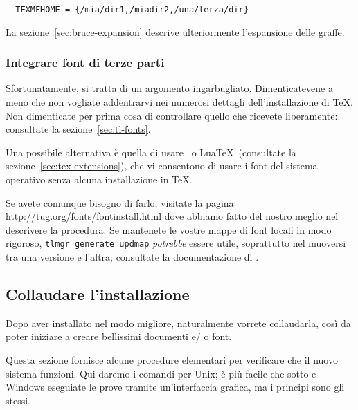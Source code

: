 \documentclass{article}
\begin{document}
\begin{verbatim}
  TEXMFHOME = {/mia/dir1,/miadir2,/una/terza/dir}
\end{verbatim}

La sezione~\ref{sec:brace-expansion} descrive ulteriormente l'espansione
delle graffe.


\subsubsection{Integrare font di terze parti}

Sfortunatamente, si tratta di un argomento ingarbugliato. Dimenticatevene
a meno che non vogliate addentrarvi nei numerosi dettagli
dell'installazione di \TeX{}. Non dimenticate per prima cosa di
controllare quello che ricevete liberamente: consultate la
sezione~\ref{sec:tl-fonts}.

Una possibile alternativa è quella di usare \XeTeX\ o Lua\TeX\ (consultate
la sezione~\ref{sec:tex-extensions}), che vi consentono di usare i font
del sistema operativo senza alcuna installazione in \TeX.

Se avete comunque bisogno di farlo, visitate la pagina
\url{http://tug.org/fonts/fontinstall.html} dove abbiamo fatto del nostro
meglio nel descrivere la procedura. Se mantenete le vostre mappe di font
locali in modo rigoroso, \texttt{tlmgr generate updmap} \textit{potrebbe}
essere utile, soprattutto nel muoversi tra una versione e l'altra;
consultate la documentazione di .


\subsection{Collaudare l'installazione}
\label{sec:test-install}

Dopo aver installato \TL{} nel modo migliore, naturalmente vorrete
collaudarla, così da poter iniziare a creare bellissimi documenti e\slash
o font.

Questa sezione fornisce alcune procedure elementari per verificare che il
nuovo sistema funzioni. Qui daremo i comandi per Unix; è più facile che
sotto \MacOSX e Windows eseguiate le prove tramite un'interfaccia grafica,
ma i principi sono gli stessi.
\end{document}

